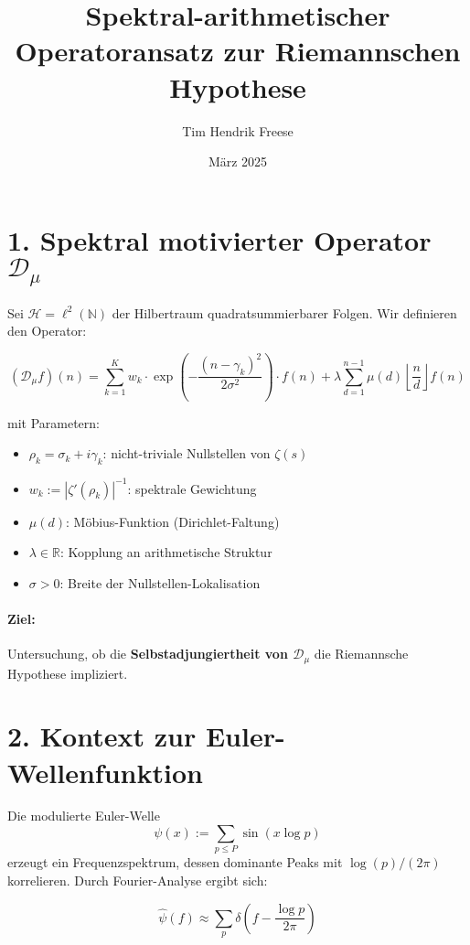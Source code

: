 \documentclass[12pt]{article}
\title{Spektral-arithmetischer Operatoransatz zur Riemannschen Hypothese}
\author{Tim Hendrik Freese}
\date{März 2025}
\begin{document}
\maketitle

\section*{1. Spektral motivierter Operator \boldmath$\mathcal{D}_\mu$}

Sei \(\mathcal{H} = \ell^2(\mathbb{N})\) der Hilbertraum quadratsummierbarer Folgen. Wir definieren den Operator:

\begin{equation}
(\mathcal{D}_\mu f)(n) = \sum_{k=1}^{K} w_k \cdot \exp\left(-\frac{(n - \gamma_k)^2}{2\sigma^2} \right) \cdot f(n) 
+ \lambda \sum_{d=1}^{n-1} \mu(d) \left\lfloor \frac{n}{d} \right\rfloor f(n)
\end{equation}

mit Parametern:
\begin{itemize}
  \item \(\rho_k = \sigma_k + i\gamma_k\): nicht-triviale Nullstellen von \(\zeta(s)\)
  \item \(w_k := \left| \zeta'(\rho_k) \right|^{-1}\): spektrale Gewichtung
  \item \(\mu(d)\): Möbius-Funktion (Dirichlet-Faltung)
  \item \(\lambda \in \mathbb{R}\): Kopplung an arithmetische Struktur
  \item \(\sigma > 0\): Breite der Nullstellen-Lokalisation
\end{itemize}

\paragraph{Ziel:} Untersuchung, ob die \textbf{Selbstadjungiertheit von \(\mathcal{D}_\mu\)} die Riemannsche Hypothese impliziert.

\section*{2. Kontext zur Euler-Wellenfunktion}

Die modulierte Euler-Welle
\[
\psi(x) := \sum_{p \leq P} \sin(x \log p)
\]
erzeugt ein Frequenzspektrum, dessen dominante Peaks mit \(\log(p)/(2\pi)\) korrelieren. Durch Fourier-Analyse ergibt sich:

\begin{equation}
\widehat{\psi}(f) \approx \sum_p \delta\left(f - \frac{\log p}{2\pi} \right)
\end{equation}
\end{document}
